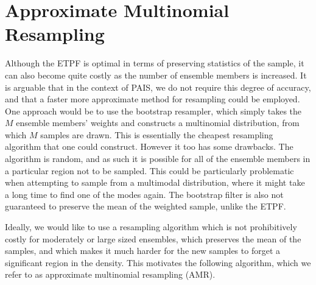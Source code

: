 \documentclass[final]{siamltex}
\begin{document}

\section{Approximate Multinomial Resampling}\label{sec:AMR}
Although the ETPF is optimal in terms of preserving statistics of the
sample, it can also become quite costly as the number of ensemble members
is increased. It is arguable that in the context of PAIS, we do not
require this degree of accuracy, and that a faster more approximate
method for resampling could be employed. One approach would be to use
the bootstrap resampler, which simply takes the $M$ ensemble members'
weights and constructs a multinomial distribution, from which $M$
samples are drawn. This is essentially the cheapest resampling
algorithm that one could construct. However it too has some
drawbacks. The algorithm is random, and as such it is possible for all
of the ensemble members in a particular region not to be sampled. This
could be particularly problematic when attempting to sample from a
multimodal distribution, where it might take a long time to find one
of the modes again. The bootstrap filter is also not guaranteed to
preserve the mean of the weighted sample, unlike the ETPF.

Ideally, we would like to use a resampling algorithm which is not
prohibitively costly for moderately or large sized ensembles,
which preserves the mean of the samples, and which makes it much
harder for the new samples to forget a significant region in the
density. This motivates the following algorithm, which we refer to as
approximate multinomial resampling (AMR).
\end{document}
